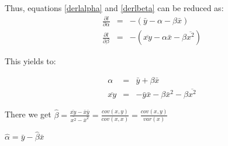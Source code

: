 \documentclass[a4paper]{tufte-book}
\begin{document}
Thus, equations \ref{derlalpha} and \ref{derlbeta} can be reduced as:
\begin{eqnarray}
    \frac{\partial l}{\partial \alpha} &=& - (\bar{y} - \alpha - \beta \bar{x})
    \label{deralpha2}\\
    \frac{\partial l}{\partial \beta} &=& - (\overline{xy} - \alpha \bar{x} - \beta \overline{x^2})
    \label{derbeta2}
\end{eqnarray}

This yields to:

\begin{eqnarray}
    \alpha & = & \bar{y} + \beta \bar{x}\\
    \overline{xy} & = &  -\bar{y}\bar{x} - \beta \bar{x}^2 - \beta \overline{x^2}
\end{eqnarray}


There we get $\hat{\beta} = \frac{\bar{xy} - \bar{x}\bar{y}}{\bar{x^2} - \bar{x}^2} = \frac{cov(x,y)}{cov(x,x)} = \frac{cov(x,y)}{var(x)}$

$\hat{\alpha} = \bar{y} - \hat{\beta}\bar{x}$
\end{document}
